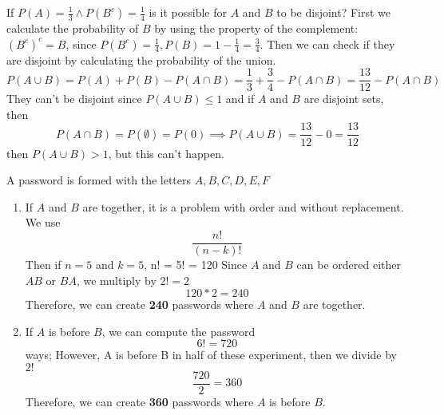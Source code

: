 \documentclass{article}
\begin{document}
    \begin{minipage}{\linewidth}
        \hspace*{-\parindent}
        \begin{solutions}
            If $P(A) = \frac{1}{3} \land P(B^c) = \frac{1}{4}$ is it possible for $A$ and $B$ to be disjoint? First we calculate the probability of $B$ by using the property of the complement: $(B^c)^c = B$, since $P(B^c) = \frac{1}{4}, P(B) = 1 - \frac{1}{4} = \frac{3}{4}$. Then we can check if they are disjoint by calculating the probability of the union.
            \[
                P(A \cup B) = P(A) + P(B) - P(A \cap B) = \frac{1}{3} + \frac{3}{4} - P(A \cap B)= \frac{13}{12} - P(A \cap B) 
            \]
            They can't be disjoint since $P(A \cup B) \leq 1$ and if $A$ and $B$ are disjoint sets, then
            \[
                P(A \cap B) = P(\emptyset) = P(0) \implies P(A \cup B) = \frac{13}{12} - 0 = \frac{13}{12}
            \]
            then $P(A \cup B) > 1$, but this can't happen.
            \medskip           
        \end{solutions}
        \begin{solutions}
        A password is formed with the letters ${A, B, C, D, E, F}$
            \begin{enumerate}[label=\alph*)]
                \item If $A$ and $B$ are together, it is a problem with order and without replacement. We use 
                \[
                    \frac{n!}{(n-k)!}
                \]
                Then if $n=5$ and $k=5$, n! = 5! = 120               
                Since $A$ and $B$ can be ordered either $AB$ or $BA$, we multiply by $2! = 2$
                 \[
                    120 * 2 = 240
                 \]
                Therefore, we can create \textbf{240} passwords where $A$ and $B$ are together.
                
                \item If $A$ is before $B$, we can compute the password 
                \[
                    6! = 720 
                \] 
                ways; However, A is before B in half of these experiment, then we divide by $2!$
                \[
                    \frac{720}{2} = 360
                \]
                Therefore, we can create \textbf{360} passwords where $A$ is before $B$.
                

\end{enumerate}
\end{solutions}
\end{minipage}
\end{document}
